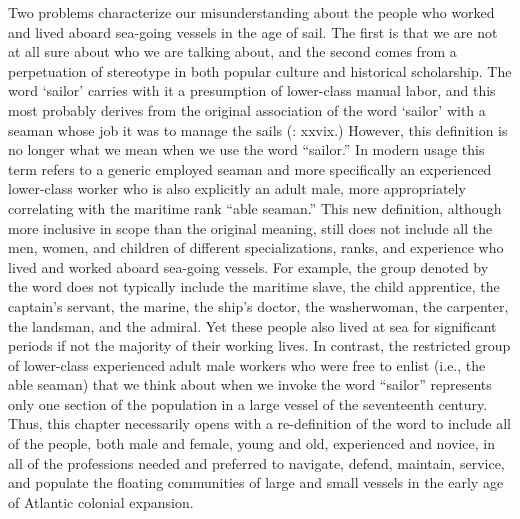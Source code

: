   Two problems characterize our misunderstanding about the people who worked and lived aboard sea-going vessels in the age of sail. The first is that we are not at all sure about who we are talking about, and the second comes from a perpetuation of stereotype in both popular culture and historical scholarship. The word ‘sailor’ carries with it a presumption of lower-class manual labor, and this most probably derives from the original association of the word ‘sailor’ with a seaman whose job it was to manage the sails (\citealt{AdkinsAdkins2008}: xxvix.) However, this definition is no longer what we mean when we use the word “sailor.” In modern usage this term refers to a generic employed seaman and more specifically an experienced lower-class worker who is also explicitly an adult male, more appropriately correlating with the maritime rank “able seaman.” This new definition, although more inclusive in scope than the original meaning, still does not include all the men, women, and children of different specializations, ranks, and experience who lived and worked aboard sea-going vessels. For example, the group denoted by the word does not typically include the maritime slave, the child apprentice, the captain’s servant, the marine, the ship’s doctor, the washerwoman, the carpenter, the landsman, and the admiral. Yet these people also lived at sea for significant periods if not the majority of their working lives. In contrast, the restricted group of lower-class experienced adult male workers who were free to enlist (i.e., the able seaman) that we think about when we invoke the word “sailor” represents only one section of the population in a large vessel of the seventeenth century. Thus, this chapter necessarily opens with a re-definition of the word to include all of the people, both male and female, young and old, experienced and novice, in all of the professions needed and preferred to navigate, defend, maintain, service, and populate the floating communities of large and small vessels in the early age of Atlantic colonial expansion. 

